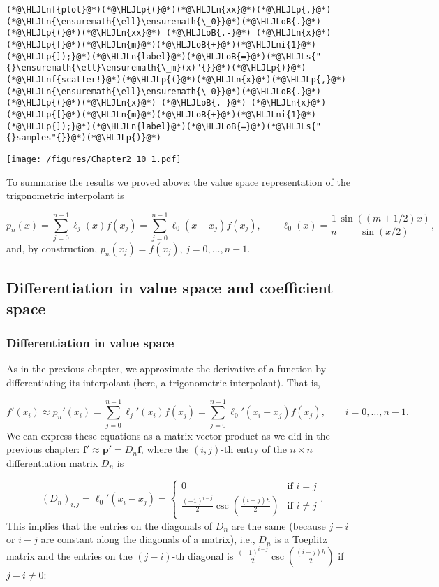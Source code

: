 \documentclass[12pt,a4paper]{article}
\newcommand{\HLJLn}[1]{#1}
\newcommand{\HLJLnf}[1]{\textcolor[RGB]{66,102,213}{#1}}
\newcommand{\HLJLs}[1]{\textcolor[RGB]{201,61,57}{#1}}
\newcommand{\HLJLni}[1]{\textcolor[RGB]{59,151,46}{#1}}
\newcommand{\HLJLoB}[1]{\textcolor[RGB]{102,102,102}{\textbf{#1}}}
\newcommand{\HLJLp}[1]{#1}
\begin{document}
\begin{lstlisting}
(*@\HLJLnf{plot}@*)(*@\HLJLp{(}@*)(*@\HLJLn{xx}@*)(*@\HLJLp{,}@*)(*@\HLJLn{\ensuremath{\ell}\ensuremath{\_0}}@*)(*@\HLJLoB{.}@*)(*@\HLJLp{(}@*)(*@\HLJLn{xx}@*) (*@\HLJLoB{.-}@*) (*@\HLJLn{x}@*)(*@\HLJLp{[}@*)(*@\HLJLn{m}@*)(*@\HLJLoB{+}@*)(*@\HLJLni{1}@*)(*@\HLJLp{]);}@*)(*@\HLJLn{label}@*)(*@\HLJLoB{=}@*)(*@\HLJLs{"{}\ensuremath{\ell}\ensuremath{\_m}(x)"{}}@*)(*@\HLJLp{)}@*)
(*@\HLJLnf{scatter!}@*)(*@\HLJLp{(}@*)(*@\HLJLn{x}@*)(*@\HLJLp{,}@*)(*@\HLJLn{\ensuremath{\ell}\ensuremath{\_0}}@*)(*@\HLJLoB{.}@*)(*@\HLJLp{(}@*)(*@\HLJLn{x}@*) (*@\HLJLoB{.-}@*) (*@\HLJLn{x}@*)(*@\HLJLp{[}@*)(*@\HLJLn{m}@*)(*@\HLJLoB{+}@*)(*@\HLJLni{1}@*)(*@\HLJLp{]);}@*)(*@\HLJLn{label}@*)(*@\HLJLoB{=}@*)(*@\HLJLs{"{}samples"{}}@*)(*@\HLJLp{)}@*)
\end{lstlisting}

\texttt{[image: /figures/Chapter2\_10\_1.pdf]}

To summarise the results we proved above: the value space representation of the trigonometric interpolant is

\[
p_n(x) = \sum_{j=0}^{n-1}\ell_j(x)f(x_j) = \sum_{j=0}^{n-1}\ell_0(x-x_j)f(x_j), \qquad \ell_0(x) = \frac{1}{n}\frac{\sin((m+1/2)x)}{\sin(x/2)},
\]
and, by construction, $p_n(x_j) = f(x_j)$, $j = 0, \ldots, n-1$.

\subsection{Differentiation in value space and coefficient space}
\subsubsection{Differentiation in value space}
As in the previous chapter, we approximate the derivative of a function by differentiating its interpolant (here, a trigonometric interpolant). That is,

\[
f'(x_i) \approx p_n'(x_i) = \sum_{j=0}^{n-1}\ell_{j}'(x_i) f(x_{j})  = \sum_{j=0}^{n-1}\ell_{0}'(x_i-x_j)f(x_{j}), \qquad i = 0, \ldots, n-1.
\]
We can express these equations as a matrix-vector product as we did in the previous chapter: $\mathbf{f}' \approx \mathbf{p}' = D_n \mathbf{f}$, where the $(i,j)$-th entry of the $n \times n$ differentiation matrix $D_n$ is

\[
\left(D_n \right)_{i,j} = \ell_{0}'(x_i-x_j) = \begin{cases}
 0 & \text{if } i = j \\
 \frac{(-1)^{i-j}}{2}\csc\left( \frac{(i-j)h}{2} \right)  & \text{if } i\neq j
\end{cases}.
\]
This implies that the entries on the diagonals of $D_n$ are the same (because $j - i$ or $i-j$ are constant along the diagonals of a matrix), i.e., $D_n$ is a Toeplitz matrix  and the entries  on the $(j-i)$-th diagonal is $\frac{(-1)^{i-j}}{2}\csc\left( \frac{(i-j)h}{2} \right)$ if $j - i \neq 0$:
\end{document}
